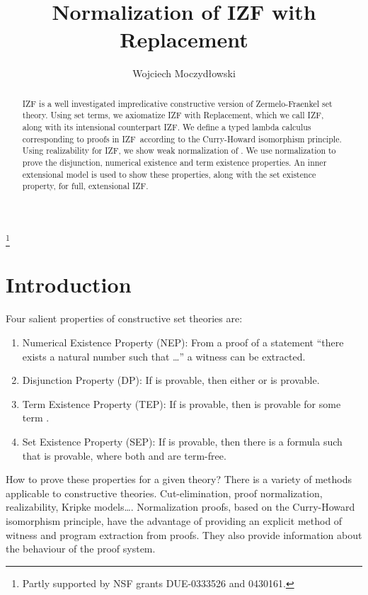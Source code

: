 \documentclass{LMCS}
\newcommand{\izfr}{IZF}
\newcommand{\iizfr}{IZF}
\begin{document}
\title{Normalization of IZF with Replacement}

\author{Wojciech Moczyd\l owski}
\address{Department of Computer Science, Cornell University, Ithaca, NY\ 14853, USA}
\thanks{Partly supported by NSF grants DUE-0333526 and 0430161.}

\titlecomment{}

\begin{abstract}
\noindent
IZF is a well investigated impredicative constructive version of
Zermelo-Fraen\-kel set theory. Using set terms, we axiomatize IZF with
Replacement, which we call \izfr, along with its intensional
counterpart \iizfr. We define a typed lambda calculus 
corresponding to proofs in \iizfr\ according to the Curry-Howard
isomorphism principle. Using realizability for \iizfr, we show weak
normalization of . We use normalization to prove the disjunction,
numerical existence and term existence properties.  An inner
extensional model is used to show these properties, along with the set
existence property, for full, extensional \izfr.
\end{abstract}

\maketitle

\section{Introduction}

Four salient properties of constructive set theories are:
\begin{enumerate}[]
\item Numerical Existence Property (NEP): From a proof of a statement
``there exists a natural number  such that {\ldots}'' a witness  can be extracted. 
\item Disjunction Property (DP): If  is provable, then
either  or  is provable.
\item Term Existence Property (TEP): If  is
provable, then  is provable for some term .
\item Set Existence Property (SEP): If  is
provable, then there is a formula  such that  is provable, where both  and  are term-free. 
\end{enumerate}

How to prove these properties for a given theory? There is a variety of
methods applicable to constructive theories. Cut-elimination, proof
normalization, realizability, Kripke models{\ldots}.
Normalization proofs, based on the Curry-Howard isomorphism principle, have the advantage of
providing an explicit method of witness and program extraction from
proofs. They also provide information about the behaviour of the proof
system. 
\end{document}
